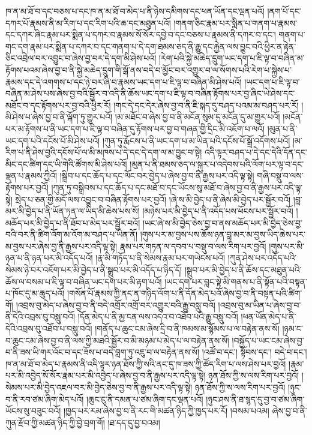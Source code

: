 ཁ་ན་མ་ཐོ་བ་དང་བཅས་པ་དང་ཁ་ན་མ་ཐོ་བ་མེད་པ་ནི་ཉེས་དམིགས་དང་ཕན་ཡོན་དང་ལྡན་པའོ། །ནག་པོ་དང་དཀར་པོ་རྣམས་ནི་མ་རིག་པ་དང་རིག་པའི་ཆ་དང་མཐུན་པའོ། །གནག་ཅིང་རྣམ་པར་སྨིན་པ་གནག་པ་རྣམས་དང་དཀར་ཞིང་རྣམ་པར་སྨིན་པ་དཀར་བ་རྣམས་སོ་སོར་དབྱེ་བ་དང་བཅས་པ་རྣམས་ནི་དཀར་བ་དང་། གནག་པ་གང་དག་རྣམ་པར་སྨིན་པ་དཀར་བ་དང་གནག་པ་དེ་དག་ཐམས་ཅད་ནི་རྒྱུ་དང་རྐྱེན་ལས་བྱུང་བའི་ཕྱིར་ན་རྟེན་ཅིང་འབྲེལ་བར་འབྱུང་བ་ཞེས་བྱ་བར་དེ་དག་མི་ཤེས་པའོ། །རེག་པའི་སྐྱེ་མཆེད་དྲུག་ཡང་དག་པ་ཇི་ལྟ་བ་བཞིན་མ་རྟོགས་པའམ་ཞེས་བྱ་བ་ནི་སྐྱེ་མཆེད་དྲུག་གི་སྒོ་ནས་བདེ་བ་མྱོང་བར་འགྱུར་བ་ལ་སོགས་པའི་རེག་པ་སྐྱེས་པ་རྣམས་དང་དེ་འགགས་པ་དང་ཉེ་བར་ཞི་བ་རྣམས་ཡང་དག་པ་ཇི་ལྟ་བ་བཞིན་མི་ཤེས་པའོ། །ཡང་དག་པ་ཇི་ལྟ་བ་བཞིན་མ་ཤེས་པས་ཞེས་བྱ་བའི་སྦྱོར་བ་འདི་ནི་ཆོས་ཡང་དག་པ་ཇི་ལྟ་བ་བཞིན་རྟོགས་པར་བྱ་ཞིང་ཡེ་ཤེས་དང་མཐོང་བ་དང་རྟོགས་པར་བྱ་བའི་ཕྱིར་རོ། །གང་དེ་དང་དེར་ཞེས་བྱ་བ་ནི་ཇི་སྐད་དུ་བཤད་པའམ་མ་བཤད་པར་རོ། །མི་ཤེས་པ་ཞེས་བྱ་བ་ནི་ལྐོག་ཏུ་གྱུར་པའོ། །མ་མཐོང་བ་ཞེས་བྱ་བ་ནི་མངོན་སུམ་དུ་མངོན་དུ་མ་གྱུར་པའོ། །མངོན་པར་མ་རྟོགས་པ་ནི་ཡང་དག་པ་ཇི་ལྟ་བ་བཞིན་དུ་རྟོགས་པར་བྱ་བ་གཞན་གྱི་དྲིང་མི་འཇོག་པ་ལའོ། །མུན་པ་ནི་ཡང་དག་པའི་དངོས་པོ་མི་ཤེས་པའོ། །ཀུན་ཏུ་རྨོངས་པ་ནི་ཡང་དག་པ་མ་ཡིན་པའི་དངོས་པོ་སྒྲོ་འདོགས་པའོ། །མ་རིག་པ་ནི་ཤེས་བྱའི་དངོས་པོ་ལ་མི་མཁས་པ་དེ་དང་དེ་དག་ལ་མ་བྱུང་བ་སྟེ། འདི་ལྟར་བཤད་པ་དེ་དང་དེའི་དོན་དང་མིང་དང་ཚིག་དང་ཡི་གེའི་ཚོགས་མི་ཤེས་པའོ། །མུན་པ་ནི་ཐམས་ཅད་ལ་སྐུར་པ་འདེབས་པའི་ལོག་པར་ལྟ་བ་དང་ལྡན་པ་རྣམས་ཀྱིའོ། །སྒྲིབ་པ་དང་ཆོད་པ་དང་ལོང་བར་བྱེད་པ་ཞེས་བྱ་བ་ནི་རྒྱས་པར་འདི་ལྟ་སྟེ། གཞི་བསྡུ་བ་ལས་རྟོགས་པར་བྱའོ། །ཀུན་ཏུ་བསྒྲིབས་པ་དང་ཆོད་པ་དང་མཐོ་བ་དང་ཡོངས་སུ་མཐོ་བ་ཞེས་བྱ་བ་ནི་རྒྱས་པར་འདི་ལྟ་སྟེ། སྲེད་པ་ཅན་གྱི་མདོ་ལས་འབྱུང་བ་བཞིན་རྟོགས་པར་བྱའོ། །ཞེ་ས་མི་བྱེད་པ་ནི་ཞེས་མི་བྱེད་པར་སྦྱོར་བའོ། །བླ་མར་མི་བྱེད་པ་ནི་ཡོན་ཏན་ལ་ཡིད་མི་ཆེས་པས་སོ། །མཉེས་པར་མི་བྱེད་པ་ནི་འདོད་པས་ཕོངས་པར་སྦྱོར་བའོ། །མཆོད་པར་མི་བྱེད་པ་ནི་ཐོབ་པ་མེད་པར་སྦྱོར་བའོ། །ཡང་ཞེ་ས་མི་བྱེད་ཅེས་བྱ་བ་ནས་མཆོད་པར་མི་བྱེད་ཅེས་བྱ་བའི་བར་ནི་ཚིག་འོག་མ་འོག་མ་བཤད་པ་ཡིན་ནོ། །གུས་པར་མ་བྱས་པས་ཆོས་ཉན་བླ་མར་མ་བྱས་ཡིད་ཆེས་པར་མ་བྱས་པར་ཞེས་བྱ་ནི་རྒྱས་པར་འདི་ལྟ་སྟེ། རྣམ་པར་གཏན་ལ་དབབ་པ་བསྡུ་བ་ལས་རིག་པར་བྱའོ། །གུས་པར་མི་ཉན་པ་ནི་ཉན་པར་མི་འདོད་པའོ། །རྣ་མི་གཏོད་པ་ནི་སེམས་རྣམ་པར་གཡེངས་པའོ། །ཀུན་ཤེས་པར་འདོད་པའི་སེམས་ཉེ་བར་འཇོག་པར་མི་བྱེད་པ་ནི་སྒྲུབ་པར་མི་འདོད་པ་ཉིད་དོ། །སྒྲུབ་པར་མི་བྱེད་པ་ནི་ཆོས་དང་མཐུན་པའི་ཆོས་ལ་བསམ་པ་ཇི་ལྟ་བ་བཞིན་ཡང་དག་པར་མི་རྟག་པའོ། །ཡང་དག་པར་བླང་སྟེ་མི་གནས་པ་ནི་སྟོན་པའི་བསྟན་པ་ཁོང་དུ་མ་ཆུད་པའོ། །གསོན་པོ་རྣམས་ཀྱི་ནང་ན་གཉིད་ལོག་པ་ནི་དོན་མེད་པའོ་ཞེས་བྱ་བ་ནི་བསྟན་པའི་ཚིག་གོ། །འབྲས་བུ་མེད་པ་ཞེས་བྱ་བ་ནི་བདེ་འགྲོར་འགྲོ་བར་འགྱུར་བའི་རྒྱུ་བསླུ་བའོ། །འབྲས་བུ་མ་ཡིན་པ་ཞེས་བྱ་བ་ནི་དེའི་འབྲས་བུ་བསླུ་བའོ། །དོན་མེད་པ་ནི་མྱ་ངན་ལས་འདའ་བ་འཐོབ་པའི་རྒྱུ་བསླུ་བའོ། །ཕན་ཡོན་མེད་པ་ནི་དེའི་འབྲས་བུ་འཐོབ་པ་བསླུ་བའོ། །གནོད་པ་ཆུང་ངམ་ཞེས་དྲི་བ་ནི་ཁམས་མ་སྙོམས་པ་ལ་བརྟེན་ནས་སོ། །ཉམ་ང་བ་ཆུང་ངམ་ཞེས་བྱ་བ་ནི་ལས་ཀྱི་མཐའི་སྦྱོར་བ་མི་མཉམ་པ་མེད་པ་ལ་བརྟེན་ནས་སོ། །བསྐྱོད་པ་ཡང་ངམ་ཞེས་བྱ་བ་ནི་ཟས་ཡི་གར་འོང་བ་དང་ཟོས་པ་བདེ་བླག་ཏུ་འཇུ་བ་ལ་བརྟེན་ནས་སོ། །འཚོ་བ་དང་། སྟོབས་དང་། བདེ་བ་དང་། ཁ་ན་མ་ཐོ་བ་མེད་པ་རྣམས་ནི་འདི་ལྟར་ཉན་ཐོས་ཀྱི་སའི་ནང་དུ་ཁ་ཟས་ཀྱི་ཚོད་རིག་པ་ལས་ཤེས་པར་བྱའོ། །རྣམ་པར་མི་འབྱེད་སོ་སོར་རྣམ་པར་མི་འབྱེད་པ་ཞེས་བྱ་བ་ནི་རྒྱས་པར་འདི་ལྟ་སྟེ། ཉན་ཐོས་ཀྱི་ས་ལས་རིག་པར་བྱའོ། །སེམས་པར་མི་བྱེད་འཇལ་བར་མི་བྱེད་ཅེས་བྱ་བ་ནི་རྒྱས་པར་འདི་ལྟ་སྟེ། ཉན་ཐོས་ཀྱི་ས་ལས་རིག་པར་བྱའོ། །ཉུང་བ་ནི་རབ་ཙམ་ཞིག་མེད་པའོ། །ཆུང་ངུ་ནི་དམན་པ་ཙམ་ཞིག་དང་ལྡན་པའོ། །ཉུང་ཤས་ནི་ཐ་སྙད་དུ་བྱ་བ་ཙམ་ཞིག་ཡོངས་སུ་བཟུང་བའོ། །ཁྱད་པར་རམ་ཞེས་བྱ་བ་ནི་རང་གི་མཚན་ཉིད་ཀྱི་ཁྱད་པར་རོ། །བསམ་པའམ། ཞེས་བྱ་བ་ནི་ཀུན་རྫོབ་ཀྱི་མཚན་ཉིད་ཀྱི་བྱེ་བྲག་གོ། །ཐ་དད་དུ་བྱ་བའམ། 
